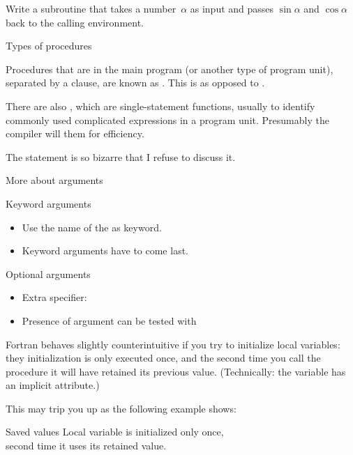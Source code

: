 \begin{exercise}
  \label{ex:ffunc-sin-cos}
  Write a subroutine  that takes a number~$\alpha$ as input
  and passes $\sin\alpha$ and $\cos\alpha$ back to the calling
  environment.
\end{exercise}

 {Types of procedures}

Procedures that are in the main program (or another type of program
unit), separated by a  clause, are known as
. This is as opposed to
.

There are also , which are
single-statement functions, usually to identify commonly used
complicated expressions in a program unit. Presumably the compiler
will  them for efficiency.

The  statement is so bizarre that I refuse to discuss it.

 {More about arguments}

\begin{block}{Keyword arguments}
  \label{sl:funcf:keyword}
  \begin{itemize}
  \item Use the name of the  as
    keyword.
  \item Keyword arguments have to come last.
  \end{itemize}
\end{block}

\begin{block}{Optional arguments}
  \label{sl:funcf:optional}
  \begin{itemize}
  \item Extra specifier: 
  \item Presence of argument can be tested with 
  \end{itemize}
\end{block}

Fortran behaves slightly counterintuitive if you try to initialize
local variables: they initialization is only executed once, and the
second time you call the procedure it will have retained its previous
value. (Technically: the variable has an implicit 
attribute.)

This may trip you up as the following example shows:

\begin{block}{Saved values}
  \label{sl:func-param-save}
  Local variable is initialized only once,\\
  second time it uses its retained value.
  
\end{block}



